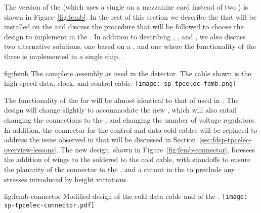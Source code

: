 The  version of the  (which uses a single 
 on a mezzanine card instead of two  
) is shown in Figure~\ref{fig:femb}. In the rest of
this section we describe the  that will be installed
on the  and discuss the procedure that will be 
followed to choose the  design %
to implement in the %
. %
In addition to
describing , , and ,
we also discuss two alternative solutions, one based on a 
 , and one where the functionality of the
three  is implemented in a single chip, .

\begin{dunefigure}
{fig:femb}
{The complete  assembly as used in the  
detector. The cable shown is the high-speed data, clock, and control cable.}
\texttt{[image: sp-tpcelec-femb.png]}
\end{dunefigure}

The functionality of the  for  will be
almost identical to that of  used in .
The design will change slightly to accommodate the new ,
which will also entail changing the connections to the ,
and changing the number of voltage regulators. In addition, the
connector for the control and data cold cables will be replaced
to address the issue observed in  that will be discussed
in Section~\ref{sec:fdsp-tpcelec-overview-lessons}. The new design,
shown in Figure~\ref{fig:femb-connector}, foresees the addition
of wings to the  soldered to the cold cable, with 
standoffs to ensure the planarity of the connector
to the , and a cutout in the  to preclude %
any stresses introduced by height variations.

\begin{dunefigure}
{fig:femb-connector}
{Modified design of the cold data cable and of the  .}
\texttt{[image: sp-tpcelec-connector.pdf]}
\end{dunefigure}

